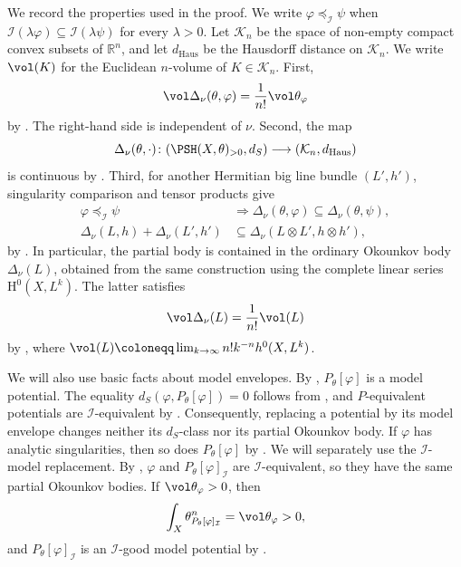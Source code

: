 \documentclass[11pt,a4paper]{amsart}
\newcommand{\dHaus}{d_{\mathrm{Haus}}}
\newcommand{\dS}{d_{S}}
\newcommand{\Kconv}{\mathcal K_n}
\begin{document}
We record the properties used in the proof.  We write
$\varphi\preceq_{\mathcal{I}}\psi$ when
$\mathcal{I}(\lambda\varphi)\subseteq\mathcal{I}(\lambda\psi)$ for every $\lambda>0$.
Let $\Kconv$ be the space of non-empty compact convex subsets of
$\mathbb R^n$, and let $\dHaus$ be the Hausdorff distance on $\Kconv$.
We write $\vol(K)$ for the Euclidean $n$-volume of
$K\in\Kconv$.
First,
\begin{equation}\label{eq:partial-body-volume}
 \vol \Delta_\nu(\theta,\varphi) =\frac{1}{n!}\vol \theta_{\varphi}
\end{equation}
by \cite[Corollary~10.3.2]{Xiabook}.  The right-hand side is independent of
$\nu$.  Second, the map
\[
 \Delta_\nu(\theta,\cdot)\colon
 (\PSH(X,\theta)_{>0},\dS)\longrightarrow(\Kconv,\dHaus)
\]
is continuous by \cite[Theorem~10.3.2]{Xiabook}.  Third, for another Hermitian
big line bundle $(L',h')$, singularity comparison and tensor products give
\begin{align}
 \varphi\preceq_{\mathcal{I}}\psi
 &\Longrightarrow
 \Delta_\nu(\theta,\varphi)\subseteq
 \Delta_\nu(\theta,\psi),                                      \label{eq:body-monotonicity}\\
 \Delta_\nu(L,h)+\Delta_\nu(L',h')
 &\subseteq
 \Delta_\nu(L\otimes L',h\otimes h'),                         \label{eq:body-Minkowski}
\end{align}
by \cite[Propositions~10.3.8 and~10.3.10]{Xiabook}.  In particular, the
partial body is contained in the ordinary Okounkov body $\Delta_\nu(L)$,
obtained from the same construction using the complete linear series
$\mathrm{H}^0(X,L^k)$.
The latter satisfies
\begin{equation}\label{eq:ordinary-volume}
 \vol \Delta_\nu(L)=\frac{1}{n!}\vol(L)
\end{equation}
by \cite[Corollary~10.3.1]{Xiabook}, where $\vol(L)\coloneqq \lim_{k\to\infty}n!k^{-n}h^0(X,L^k)$.

We will also use basic facts about model envelopes.  By
\cite[Corollary~3.1.2]{Xiabook}, $P_\theta[\varphi]$ is a model potential.
The equality $\dS(\varphi,P_\theta[\varphi])=0$ follows from
\cite[Proposition~6.2.2]{Xiabook}, and $P$-equivalent potentials are
$\mathcal{I}$-equivalent by \cite[Proposition~3.2.9]{Xiabook}.  Consequently, replacing
a potential by its model envelope changes neither its $\dS$-class nor its
partial Okounkov body.  If $\varphi$ has analytic singularities, then so does
$P_\theta[\varphi]$ by \cite[Proposition~3.2.10]{Xiabook}.
We will separately use the $\mathcal I$-model replacement.  By
\cite[Proposition~3.2.6]{Xiabook}, $\varphi$ and
$P_\theta[\varphi]_{\mathcal I}$ are $\mathcal I$-equivalent, so they have
the same partial Okounkov bodies.  If $\vol\theta_\varphi>0$, then
\[
 \int_X\theta_{P_\theta[\varphi]_{\mathcal I}}^n
 =\vol\theta_\varphi>0,
\]
and $P_\theta[\varphi]_{\mathcal I}$ is an $\mathcal I$-good model
potential by \cite[Example~7.1.2]{Xiabook}.
\end{document}

